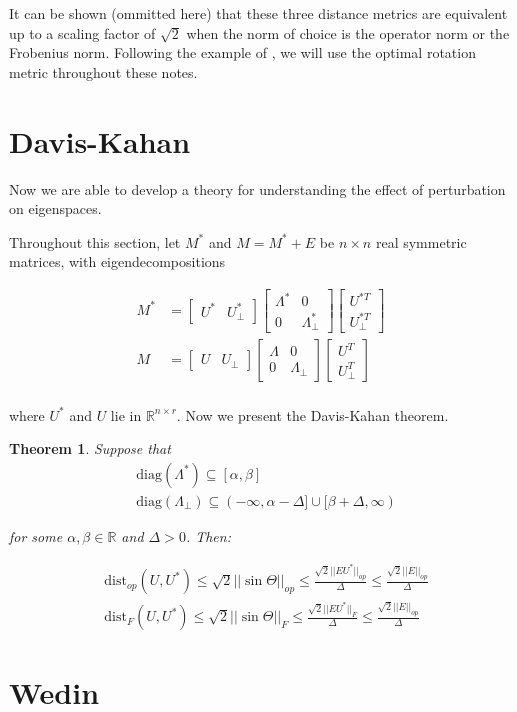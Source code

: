 \documentclass{amsart}
\newcommand{\R}{\mathbb{R}}
\newcommand{\dist}{\textrm{dist}}
\newtheorem{theorem}{Theorem}
\begin{document}
It can be shown (ommitted here) that these three distance metrics are equivalent up to a scaling factor of $\sqrt{2}$ when the norm of choice is the operator norm or the Frobenius norm. Following the example of \cite{chen_spectral_2021}, we will use the optimal rotation metric throughout these notes.

\section{Davis-Kahan}

Now we are able to develop a theory for understanding the effect of perturbation on eigenspaces.

\bigskip

Throughout this section, let $M^{*}$ and $M = M^{*} + E$ be $n \times n$ real symmetric matrices, with eigendecompositions

\begin{align*}
  M^{*} &= \begin{bmatrix}U^{*} & U^{*}_{\perp} \end{bmatrix} \begin{bmatrix}\Lambda^{*} & 0 \\ 0 & \Lambda^{*}_{\perp} \end{bmatrix} \begin{bmatrix} U^{*T} \\ U^{*T}_{\perp}\end{bmatrix} \\
  M &= \begin{bmatrix}U & U_{\perp} \end{bmatrix} \begin{bmatrix}\Lambda & 0 \\ 0 & \Lambda_{\perp} \end{bmatrix} \begin{bmatrix} U^{T} \\ U^{T}_{\perp}\end{bmatrix} \\
\end{align*}

where $U^{*}$ and $U$ lie in $\R^{n \times r}$. Now we present the Davis-Kahan theorem.

\begin{theorem}
  Suppose that
  \begin{align*}
    &\textrm{diag} (\Lambda^{*}) \subseteq [\alpha, \beta] \\
    &\textrm{diag} (\Lambda_{{\perp}}) \subseteq (-\infty, \alpha - \Delta] \cup [\beta + \Delta, \infty)
  \end{align*}

  for some $\alpha, \beta \in \R$ and $\Delta > 0$. Then:

  \begin{align*}
    &\dist_{op} (U, U^{*}) \leq \sqrt{2}||\sin \Theta ||_{op} \leq \frac{\sqrt{2}||EU^{*}||_{op}}{\Delta} \leq \frac{\sqrt{2}||E||_{op}}{\Delta} \\
    &\dist_{F}(U, U^{*}) \leq \sqrt{2}||\sin \Theta ||_{F} \leq \frac{\sqrt{2}||EU^{*}||_{F}}{\Delta} \leq \frac{\sqrt{2}||E||_{op}}{\Delta}
   \end{align*}

\end{theorem}
\section{Wedin}



\end{document}
